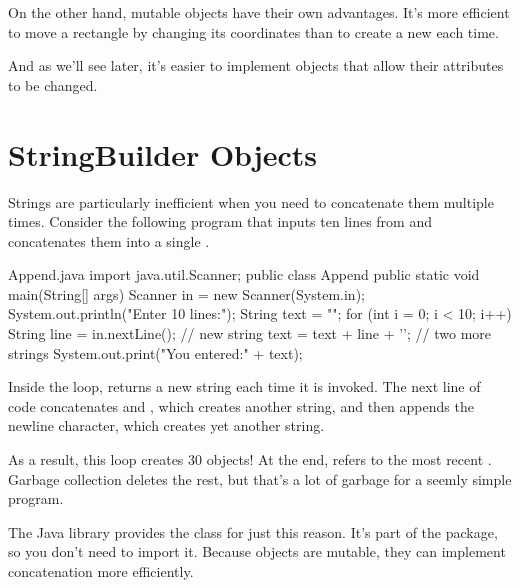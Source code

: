 
On the other hand, mutable objects have their own advantages.
It's more efficient to move a rectangle by changing its coordinates than to create a new  each time.

And as we'll see later, it's easier to implement objects that allow their attributes to be changed.


\section{StringBuilder Objects}
\label{stringbuilder}


Strings are particularly inefficient when you need to concatenate them multiple times.
Consider the following program that inputs ten lines from  and concatenates them into a single .


\begin{trinket}[325]{Append.java}
import java.util.Scanner;
public class Append {
    public static void main(String[] args) {
        Scanner in = new Scanner(System.in);
        System.out.println("Enter 10 lines:");
        String text = "";
        for (int i = 0; i < 10; i++) {
            String line = in.nextLine();        // new string
            text = text + line + '\n';    // two more strings
        }
        System.out.print("You entered:\n" + text);
    }
}
\end{trinket}

Inside the  loop,  returns a new string each time it is invoked.
The next line of code concatenates  and , which creates another string, and then appends the newline character, which creates yet another string.

As a result, this loop creates 30  objects!
At the end,  refers to the most recent .
Garbage collection deletes the rest, but that's a lot of garbage for a seemly simple program.

The Java library provides the  class for just this reason.
It's part of the  package, so you don't need to import it.
Because  objects are mutable, they can implement concatenation more efficiently.

